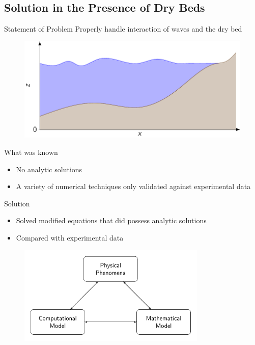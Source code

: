 \documentclass[pdf]{beamer}
\begin{document}
\subsection{Solution in the Presence of Dry Beds}
\begin{frame}{Statement of Problem}
	Properly handle interaction of waves and the dry bed
		\begin{figure}
			\includegraphics[width=\textwidth]{./Pics/WaterModelDiagrams/FressSurface.pdf}
		\end{figure}
\end{frame}

\begin{frame}{What was known}
	\begin{itemize}
		\item No analytic solutions
		\item A variety of numerical techniques only validated against experimental data
	\end{itemize}
\end{frame}

\begin{frame}{Solution}
	\begin{itemize}
		\item Solved modified equations that did possess analytic solutions
		\item Compared with experimental data
	\end{itemize}
	\begin{figure}
		\includegraphics[width=0.8\textwidth]{./Pics/ModelDiagrams/FlowChart.pdf}
	\end{figure}
\end{frame}
\end{document}
